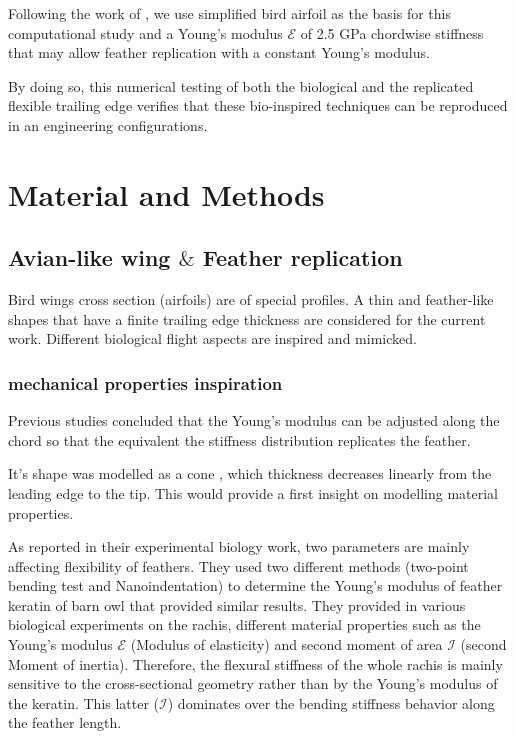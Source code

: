 %
Following the work of \citet{Gamble2020b}, we use simplified bird airfoil as the basis for this computational study and a Young's modulus $\mathcal{E}$ of 2.5 GPa chordwise stiffness that may allow feather replication with a constant Young's modulus.

By doing so, this numerical testing of both the biological and the replicated flexible trailing edge verifies that these
bio-inspired techniques can be reproduced in an engineering configurations.


\newpage
\section{Material and Methods}


\subsection{Avian-like wing $\&$ Feather replication}

Bird wings cross section (airfoils) are of special profiles.
%
A thin and feather-like shapes that have a finite trailing edge thickness are considered for the current work. 
%
Different biological flight aspects are inspired and mimicked. 

\subsubsection{mechanical properties inspiration}

Previous studies concluded that the Young's modulus can be adjusted along the chord so that the equivalent the stiffness distribution replicates the feather.

It's shape was modelled as a cone \cite{Lingham-Soliar2017MicrostructuralFeathers}, which thickness decreases linearly from the leading edge to the tip. This would provide a first insight on modelling material properties.

As \citet{Bachmann2012} reported in their experimental biology work, two parameters are mainly affecting flexibility of feathers.
%
They used two different methods (two-point bending test and Nanoindentation) to determine the Young's modulus of feather keratin of barn owl that provided similar results.
%
They provided in various biological experiments on the rachis, different material properties such as the Young's modulus $\mathcal{E}$ (Modulus of elasticity) and second moment of area $\mathcal{I}$ (second Moment of inertia). 
%
Therefore, the flexural stiffness of the whole rachis is mainly sensitive to the cross-sectional geometry rather than by the Young's modulus of the keratin.
%
This latter ($\mathcal{I}$) dominates over the bending stiffness behavior along the feather length.

